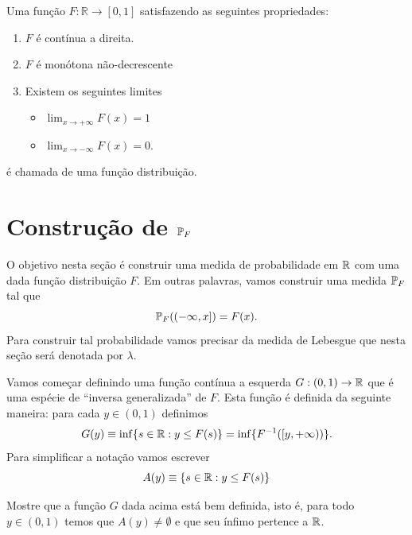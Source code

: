 \begin{definicao}
Uma função $F:\mathbb{R}\to [0,1]$ satisfazendo 
as seguintes propriedades:
\begin{enumerate}
	\item	
	$F$ é contínua a direita.
	
	\item
	$F$ é monótona não-decrescente	
		
	\item 
	Existem os seguintes limites 
		\begin{itemize}
			\item 
 			$\displaystyle\lim_{x\to+\infty} F(x)=1$		
			
			\item
			$\displaystyle\lim_{x\to -\infty} F(x)=0$.
		\end{itemize}
\end{enumerate}
é chamada de uma função distribuição.
\end{definicao}






\section{Construção de $\P_{F}$}

O objetivo nesta seção é construir uma 
medida de probabilidade em $\R$ com uma 
dada função distribuição $F$. 
Em outras palavras, vamos construir
uma medida $\P_F$ tal que 
\[
	\P_{F}((-\infty,x]) = F(x).
\]
Para construir tal probabilidade
vamos precisar da medida de Lebesgue que 
nesta seção será denotada por $\lambda$.


Vamos começar definindo uma função contínua a 
esquerda $G:(0,1)\to\R$ que é uma espécie de 
``inversa generalizada'' de $F$.
Esta função é definida da seguinte maneira:
para cada $y\in (0,1)$ definimos 
	\[
		G(y)
		\equiv 
		\inf\{ s\in\R: y\leq F(s)\} 
		= 
		\inf \{ F^{-1}([y,+\infty))\}.
	\]
Para simplificar a notação vamos escrever
	\[
	 	A(y)\equiv \{ s\in\R: y\leq F(s)\}
	\]	

\begin{exercicio}
 Mostre que a função $G$ dada acima está bem definida,
 isto é, para todo $y\in (0,1)$ temos que 
 $A(y)\neq \emptyset$ e que seu ínfimo pertence a $\R$.
\end{exercicio}

